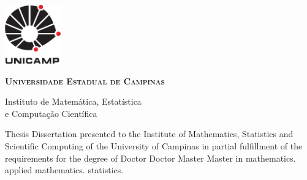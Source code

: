 \thispagestyle{plain}
\includegraphics[width=.94in, height=1in,
keepaspectratio=true]{figuras/unicamp-logo}
\begin{center}
  {\large\textbf{\textsc{Universidade Estadual de Campinas}}
  \vspace{.4cm}

  Instituto de Matemática, Estatística \\
  e Computação Científica}
\end{center}
\vspace{.01cm}
\begin{center}
  {\large\textbf{\textsc{\autor}}}
\end{center}
\vspace{.01cm}
\begin{center}
  {\Large\textbf{\textsc{\titulo}}}
\end{center}
\vspace{.01cm}
\begin{center}
  {\Large\textsl{\textsc{\titulopt}}}
\end{center}
\vspace{.01cm}

\begin{flushright}
  \begin{minipage}[c]{.5\textwidth}
    \ifx\mestrado\undefined
    Thesis
    \else
    Dissertation
    \fi
    presented to the Institute of Mathematics, Statistics and Scientific Computing
    of the University of Campinas in partial
    fulfillment of the requirements for the degree of
    \ifx\mestrado\undefined
    \ifx\femaleAuthor\undefined
    Doctor
    \else
    Doctor
    \fi
    \else
    \ifx\femaleAuthor\undefined
    Master
    \else
    Master
    \fi
    \fi
    in
    \ifx\matematica\undefined
    \else
    mathematics.
    \fi
    \ifx\aplicada\undefined
    \else
    applied mathematics.
    \fi
    \ifx\estatistica\undefined
    \else
    statistics.
    \fi
  \end{minipage}
\end{flushright}

